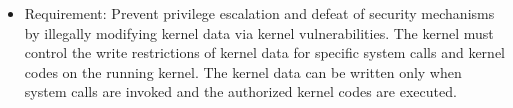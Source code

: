 \begin{itemize}%
\item Requirement: Prevent privilege escalation and defeat of security mechanisms
 by illegally modifying kernel data via kernel vulnerabilities.
  The kernel must control the write restrictions of kernel data for specific
  system calls and kernel codes on the running kernel.
  The kernel data can be written only %
  when system calls are invoked and the authorized kernel codes are executed.




\end{itemize}


